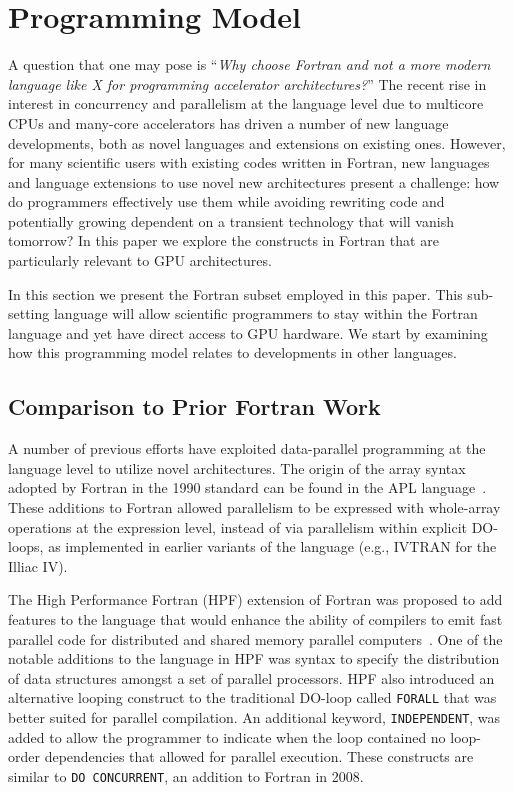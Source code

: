 \section{Programming Model}

A question that one may pose is ``\emph{Why choose Fortran and not a
  more modern language like X for programming accelerator
  architectures?}''  The recent rise in interest in concurrency and
parallelism at the language level due to multicore CPUs and
many-core accelerators has driven a number of new language
developments, both as novel languages and extensions on existing ones.
However, for many scientific users with existing codes written in
Fortran, new languages and language extensions to use novel new
architectures present a challenge: how do programmers effectively use
them while avoiding rewriting code and potentially growing dependent
on a transient technology that will vanish tomorrow?  In this paper we
explore the constructs in Fortran that are particularly relevant to
GPU architectures.

In this section we present the Fortran subset employed in this paper.
This sub-setting language will allow scientific programmers to stay
within the Fortran language and yet have direct access to GPU
hardware.  We start by examining how this programming model relates to
developments in other languages.


\subsection{Comparison to Prior Fortran Work}



A number of previous efforts have exploited data-parallel programming
at the language level to utilize novel architectures.  The origin of
the array syntax adopted by Fortran in the 1990 standard can be found
in the APL language~\citep{iverson79apl}.  These additions to Fortran
allowed parallelism to be expressed with whole-array operations at the
expression level, instead of via parallelism within explicit DO-loops,
as implemented in earlier variants of the language (e.g., IVTRAN for the
Illiac IV).

The High Performance Fortran (HPF) extension of Fortran was proposed
to add features to the language that would enhance the ability of
compilers to emit fast parallel code for distributed and shared memory
parallel computers~\citep{koelbel94hpf}.  One of the notable additions
to the language in HPF was syntax to specify the distribution of data
structures amongst a set of parallel processors.  HPF also introduced
an alternative looping construct to the traditional DO-loop called
{\tt FORALL} that was better suited for parallel compilation.  An
additional keyword, {\tt INDEPENDENT}, was added to allow the
programmer to indicate when the loop contained no loop-order
dependencies that allowed for parallel execution.  These constructs
are similar to {\tt DO CONCURRENT}, an addition to Fortran in 2008.

